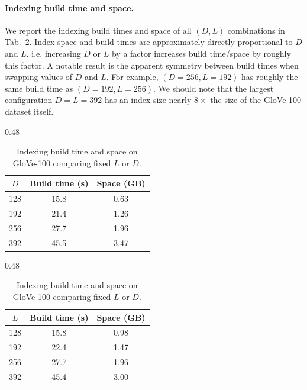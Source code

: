 \documentclass{article}
\newcommand{\glv}{GloVe-100\xspace}
\begin{document}
\paragraph{Indexing build time and space.}

We report the indexing build times and space of all $(D, L)$ combinations in Tab.~\ref{tab:index-compare-DL}. Index space and build times are approximately directly proportional to $D$ and $L$. i.e. increasing $D$ or $L$ by a factor increases build time/space by roughly this factor. A notable result is the apparent symmetry between build times when swapping values of $D$ and $L$. For example, $(D=256, L=192)$ has roughly the same build time as $(D = 192, L = 256)$. We should note that the largest configuration $D=L=392$ has an index size nearly $8 \times$ the size of the \glv dataset itself.

\begin{table}[H]
    \centering

    \begin{subtable}{0.48\textwidth}
        \centering
        \begin{tabular}{c cc}
            $D$ & Build time (s) & Space (GB) \\
            \hline
            128 & 15.8 & 0.63 \\
            192 & 21.4 & 1.26 \\
            256 & 27.7 & 1.96 \\
            392 & 45.5 & 3.47 \\
        \end{tabular}
        \caption{$L = 256$}
    \end{subtable}
    \hfill
    \begin{subtable}{0.48\textwidth}
        \centering
        \begin{tabular}{c cc}
            $L$ & Build time (s) & Space (GB) \\
            \hline
            128 & 15.8 & 0.98 \\
            192 & 22.4 & 1.47 \\
            256 & 27.7 & 1.96 \\
            392 & 45.4 & 3.00 \\
        \end{tabular}
        \caption{$D = 256$}
    \end{subtable}
    
    \caption{Indexing build time and space on \glv comparing fixed $L$ or $D$.}
    \label{tab:index-compare-DL}
\end{table}
\end{document}
